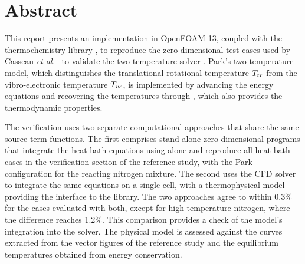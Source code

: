 \section*{Abstract}

This report presents an implementation in OpenFOAM-13, coupled with the
thermochemistry library \mpp{}, to reproduce the zero-dimensional test cases
used by Casseau \textit{et al.}~\cite{casseau2016} to validate the
two-temperature solver \hyfoam.
Park's two-temperature model, which distinguishes the
translational-rotational temperature $T_{tr}$ from the vibro-electronic
temperature $T_{ve}$, is implemented by advancing the energy equations and
recovering the temperatures through \mpp{}, which also provides the
thermodynamic properties.

The verification uses two separate computational approaches that share the
same source-term functions. The first comprises stand-alone zero-dimensional
programs that integrate the heat-bath equations using \mpp{} alone and
reproduce all heat-bath cases in the verification section of the reference
study, with the Park configuration for the reacting nitrogen mixture. The
second uses the CFD solver to integrate the same equations on a single cell,
with a thermophysical model providing the interface to the library. The two
approaches agree to within 0.3\% for the cases evaluated with both, except for
high-temperature nitrogen, where the difference reaches 1.2\%. This
comparison provides a check of the model's integration into the solver. The
physical model is assessed
against the \hyfoam{} curves extracted from the vector figures of the
reference study and the equilibrium temperatures obtained from energy
conservation.
